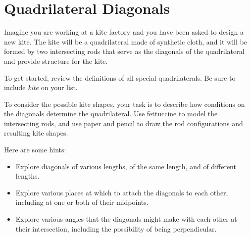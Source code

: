 \newpage

\section{Quadrilateral Diagonals}


Imagine you are working at a kite factory and you have been asked to design a new kite.  The kite will be a quadrilateral made of synthetic cloth, and it will be formed by two intersecting rods that serve as the diagonals of the quadrilateral and provide structure for the kite.  

\begin{prob}
To get started, review the definitions of all special quadrilaterals.  Be sure to include \emph{kite} on your list.  
\end{prob}

\begin{prob}
To consider the possible kite shapes, your task is to describe how conditions on the diagonals determine the quadrilateral.  Use fettuccine to model the intersecting rods, and use paper and pencil to draw the rod configurations and resulting kite shapes.  

Here are some hints:  

\begin{itemize}
\item Explore diagonals of various lengths, of the same length, and of different lengths.  
\item Explore various places at which to attach the diagonals to each other, including at one or both of their midpoints.  
\item Explore various angles that the diagonals might make with each other at their intersection, including the possibility of being perpendicular.  
\end{itemize}
\end{prob}

